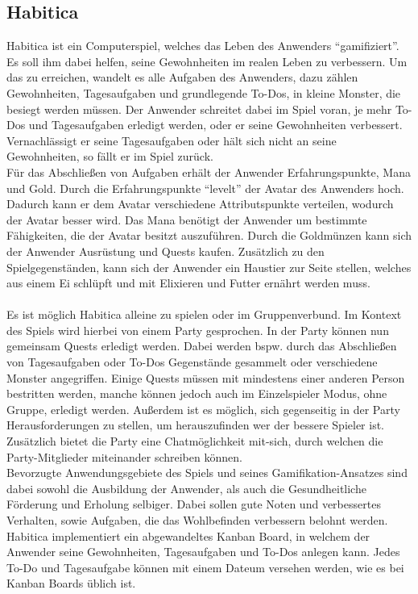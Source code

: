 \documentclass[sigconf, nonacm]{acmart}
\begin{document}

\subsection{Habitica}
Habitica ist ein Computerspiel, welches das Leben des Anwenders \enquote{gamifiziert}. Es soll ihm dabei helfen, seine Gewohnheiten im realen Leben zu verbessern. Um das zu erreichen, wandelt es alle Aufgaben des Anwenders, dazu zählen Gewohnheiten, Tagesaufgaben und grundlegende To-Dos, in kleine Monster, die besiegt werden müssen. Der Anwender schreitet dabei im Spiel voran, je mehr To-Dos und Tagesaufgaben erledigt werden, oder er seine Gewohnheiten verbessert. Vernachlässigt er seine Tagesaufgaben oder hält sich nicht an seine Gewohnheiten, so fällt er im Spiel zurück.
\\
Für das Abschließen von Aufgaben erhält der Anwender Erfahrungspunkte, Mana und Gold. Durch die Erfahrungspunkte \enquote{levelt} der Avatar des Anwenders hoch. Dadurch kann er dem Avatar verschiedene Attributspunkte verteilen, wodurch der Avatar besser wird. Das Mana benötigt der Anwender um bestimmte Fähigkeiten, die der Avatar besitzt auszuführen. Durch die Goldmünzen kann sich der Anwender Ausrüstung und Quests kaufen. Zusätzlich zu den Spielgegenständen, kann sich der Anwender ein Haustier zur Seite stellen, welches aus einem Ei schlüpft und mit Elixieren und Futter ernährt werden muss.
\\
\\
Es ist möglich Habitica alleine zu spielen oder im Gruppenverbund. Im Kontext des Spiels wird hierbei von einem Party gesprochen. In der Party können nun gemeinsam Quests erledigt werden. Dabei werden bspw. durch das Abschließen von Tagesaufgaben oder To-Dos Gegenstände gesammelt oder verschiedene Monster angegriffen. Einige Quests müssen mit mindestens einer anderen Person bestritten werden, manche können jedoch auch im Einzelspieler Modus, ohne Gruppe, erledigt werden. Außerdem ist es möglich, sich gegenseitig in der Party Herausforderungen zu stellen, um herauszufinden wer der bessere Spieler ist. Zusätzlich bietet die Party eine Chatmöglichkeit mit-sich, durch welchen die Party-Mitglieder miteinander schreiben können.
\\
Bevorzugte Anwendungsgebiete des Spiels und seines Gamifikation-Ansatzes sind dabei sowohl die Ausbildung der Anwender, als auch die Gesundheitliche Förderung und Erholung selbiger. Dabei sollen gute Noten und verbessertes Verhalten, sowie Aufgaben, die das Wohlbefinden verbessern belohnt werden.~\cite{noauthor_funktionen_nodate}
\\
Habitica implementiert ein abgewandeltes Kanban Board, in welchem der Anwender seine Gewohnheiten, Tagesaufgaben und To-Dos anlegen kann. Jedes To-Do und Tagesaufgabe können mit einem Dateum versehen werden, wie es bei Kanban Boards üblich ist. 
\end{document}
